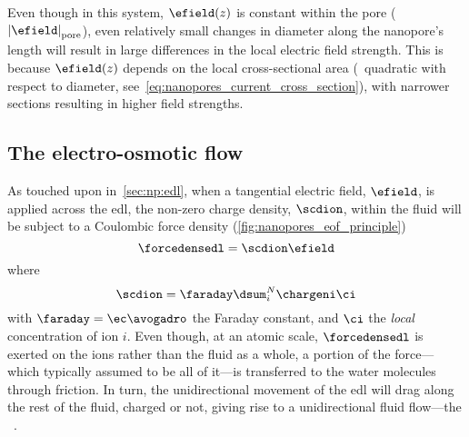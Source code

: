 %
Even though in this system, $\efield (z)$ is constant within the pore ($\left| \efield
\right|_{\text{pore}}$), even relatively small changes in diameter along the nanopore's length will result in
large differences in the local electric field strength. This is because $\efield (z)$ depends on the local
cross-sectional area (\ie~quadratic with respect to diameter, see~\cref{eq:nanopores_current_cross_section}),
with narrower sections resulting in higher field strengths.


\subsection{The electro-osmotic flow}
%
\label{sec:np:eof}
%

As touched upon in~\cref{sec:np:edl}, when a tangential electric field, $\efield$, is applied across the
\gls{edl}, the non-zero charge density, $\scdion$, within the fluid will be subject to a Coulombic force
density (\cref{fig:nanopores_eof_principle})
%
\begin{equation}\label{eq:nanopores_edl_force}
  \forcedensedl = \scdion \efield
\end{equation}
%
where
%
\begin{equation}\label{eq:nanopores_ion_scd}
  \scdion = \faraday \dsum_i^N \chargeni \ci
\end{equation}
%
with $\faraday = \ec \avogadro$ the Faraday constant, and $\ci$ the \emph{local} concentration of ion $i$.
Even though, at an atomic scale, $\forcedensedl$ is exerted on the ions rather than the fluid as a whole, a
portion of the force---which typically assumed to be all of it---is transferred to the water molecules through
friction. In turn, the unidirectional movement of the \gls{edl} will drag along the rest of the fluid, charged
or not, giving rise to a unidirectional fluid flow---the ~\cite{Bocquet-2010}.


